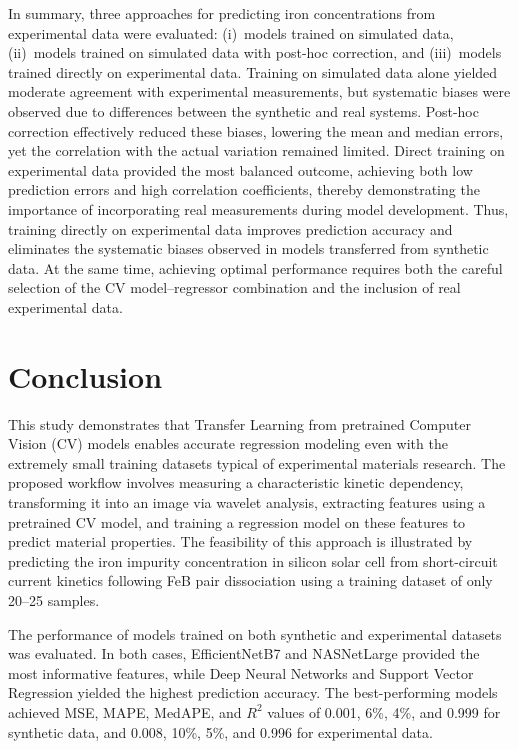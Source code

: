 \documentclass[10pt]{iopart}
\begin{document}
In summary, three approaches for predicting iron concentrations from experimental data were evaluated:
(i)~models trained on simulated data,
(ii)~models trained on simulated data with post-hoc correction,
and (iii)~models trained directly on experimental data.
Training on simulated data alone yielded moderate agreement with experimental measurements,
but systematic biases were observed due to differences between the synthetic and real systems.
Post-hoc correction effectively reduced these biases, lowering the mean and median errors,
yet the correlation with the actual variation remained limited.
Direct training on experimental data provided the most balanced outcome,
achieving both low prediction errors and high correlation coefficients,
thereby demonstrating the importance of incorporating real measurements during model development.
Thus, training directly on experimental data improves prediction accuracy and eliminates the systematic biases observed in models transferred from synthetic data.
At the same time, achieving optimal performance requires both the careful selection of the CV model–regressor combination and the inclusion of real experimental data.


\section{Conclusion}

This study demonstrates that Transfer Learning from pretrained Computer Vision (CV) models enables accurate regression modeling
even with the extremely small training datasets typical of experimental materials research.
The proposed workflow involves measuring a characteristic kinetic dependency,
transforming it into an image via wavelet analysis,
extracting features using a pretrained CV model,
and training a regression model on these features to predict material properties.
The feasibility of this approach is illustrated by predicting the iron impurity concentration in silicon solar cell
from short-circuit current kinetics following FeB pair dissociation using a training dataset of only 20–25 samples.

The performance of models trained on both synthetic and experimental datasets was evaluated.
In both cases, EfficientNetB7 and NASNetLarge provided the most informative features,
while Deep Neural Networks  and  Support Vector Regression yielded the highest prediction accuracy.
The best-performing models achieved MSE, MAPE, MedAPE, and $R^2$ values of 0.001, 6\%, 4\%, and 0.999 for synthetic data,
and 0.008, 10\%, 5\%, and 0.996 for experimental data.
\end{document}
